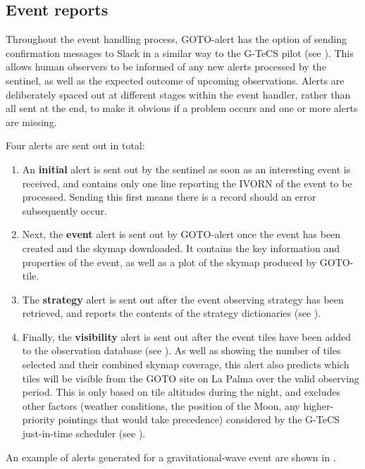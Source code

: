 
\subsection{Event reports}
\label{sec:event_slack}
\begin{colsection}

Throughout the event handling process, GOTO-alert has the option of sending confirmation messages to Slack in a similar way to the G-TeCS pilot (see ). This allows human observers to be informed of any new alerts processed by the sentinel, as well as the expected outcome of upcoming observations. Alerts are deliberately spaced out at different stages within the event handler, rather than all sent at the end, to make it obvious if a problem occurs and one or more alerts are missing.

Four alerts are sent out in total:
%
\begin{enumerate}
    \item An \textbf{initial} alert is sent out by the sentinel as soon as an interesting event is received, and contains only one line reporting the IVORN of the event to be processed. Sending this first means there is a record should an error subsequently occur.
    \item Next, the \textbf{event} alert is sent out by GOTO-alert once the event has been created and the skymap downloaded. It contains the key information and properties of the event, as well as a plot of the skymap produced by GOTO-tile.
    \item The \textbf{strategy} alert is sent out after the event observing strategy has been retrieved, and reports the contents of the strategy dictionaries (see ).
    \item Finally, the \textbf{visibility} alert is sent out after the event tiles have been added to the observation database (see ). As well as showing the number of tiles selected and their combined skymap coverage, this alert also predicts which tiles will be visible from the GOTO site on La Palma over the valid observing period. This is only based on tile altitudes during the night, and excludes other factors (weather conditions, the position of the Moon, any higher-priority pointings that would take precedence) considered by the G-TeCS just-in-time scheduler (see ).
\end{enumerate}
%
An example of alerts generated for a gravitational-wave event are shown in .


\end{colsection}
